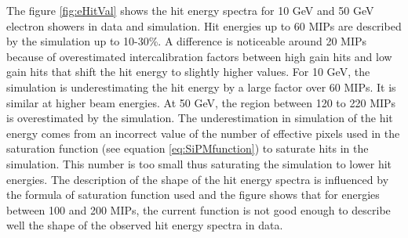The figure \ref{fig:eHitVal} shows the hit energy spectra for 10 GeV and 50 GeV electron showers in data and simulation. Hit energies up to 60 MIPs are described by the simulation up to 10-30\%. A difference is noticeable around 20 MIPs because of overestimated intercalibration factors between high gain hits and low gain hits that shift the hit energy to slightly higher values. For 10 GeV, the simulation is underestimating the hit energy by a large factor over 60 MIPs. It is similar at higher beam energies. At 50 GeV, the region between 120 to 220 MIPs is overestimated by the simulation. The underestimation in simulation of the hit energy comes from an incorrect value of the number of effective pixels used in the saturation function (see equation \ref{eq:SiPMfunction}) to saturate hits in the simulation. This number is too small thus saturating the simulation to lower hit energies. The description of the shape of the hit energy spectra is influenced by the formula of saturation function used \cite{Kotera:2015rha} and the figure shows that for energies between 100 and 200 MIPs, the current function is not good enough to describe well the shape of the observed hit energy spectra in data.

